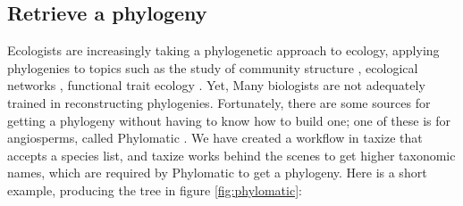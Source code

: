 \documentclass[letterpaper,superscriptaddress,showkeys,longbibliography,10pt]{revtex4-1}\usepackage{graphicx, color}
\begin{document}
\subsection{Retrieve a phylogeny}

Ecologists are increasingly taking a phylogenetic approach to ecology, applying phylogenies to topics such as the study of community structure \cite{webb2002phylogenies}, ecological networks \cite{rafferty2013phylogenetic}, functional trait ecology \cite{REF}. Yet, Many biologists are not adequately trained in reconstructing phylogenies. Fortunately, there are some sources for getting a phylogeny without having to know how to build one; one of these is for angiosperms, called Phylomatic \cite{webb2005}. We have created a workflow in taxize that accepts a species list, and taxize works behind the scenes to get higher taxonomic names, which are required by Phylomatic to get a phylogeny. Here is a short example, producing the tree in figure \ref{fig:phylomatic}:
\end{document}

